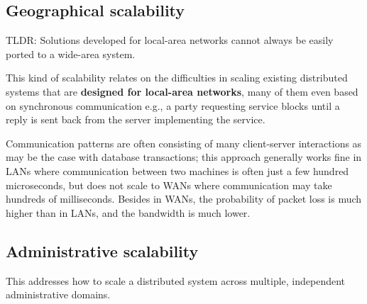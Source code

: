\subsection{Geographical scalability}

TLDR: Solutions developed for local-area networks cannot always be easily ported to a wide-area system.

This kind of scalability relates on the difficulties in scaling existing distributed systems that are \textbf{designed for local-area networks}, many of them even based on synchronous communication e.g., a party requesting service blocks until a reply is sent back from the server implementing the service.

Communication patterns are often consisting of many client-server interactions as may be the case with database transactions;
this approach generally works fine in LANs where communication between two machines is often just a few hundred microseconds, but does not scale to WANs where communication may take hundreds of milliseconds.
Besides in WANs, the probability of packet loss is much higher than in LANs, and the bandwidth is much lower.

\subsection{Administrative scalability}
This addresses how to scale a distributed system across multiple, independent administrative domains.
